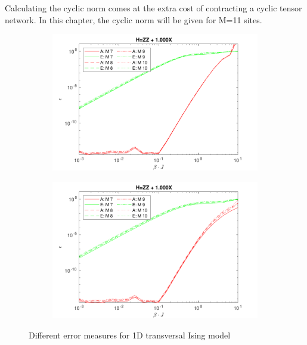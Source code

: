 Calculating the cyclic norm comes at the extra cost of contracting a cyclic tensor network. In this chapter, the cyclic norm will be given for M=11 sites.

\begin{figure}
    \begin{subfigure}[]{\linewidth}
        \includegraphics[width=\textwidth]{Figuren/benchmarking/comp_M_cycl.pdf}
    \end{subfigure}
    \begin{subfigure}[]{\linewidth}
        \includegraphics[width=\textwidth]{Figuren/benchmarking/Comp_M_lin.pdf}
    \end{subfigure}
    \caption{ Different error measures for 1D transversal Ising model }
    \label{benchmarking:systemsize}
\end{figure}

